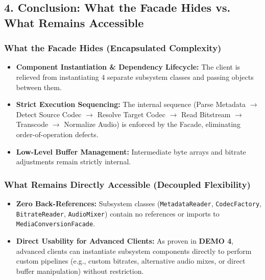 \documentclass[10pt,a4paper]{article}
\begin{document}
\clearpage

\subsection*{4. Conclusion: What the Facade Hides vs. What Remains Accessible}

\subsubsection*{What the Facade Hides (Encapsulated Complexity)}
\begin{itemize}[noitemsep,topsep=1pt,leftmargin=1.5em]
    \item \textbf{Component Instantiation \& Dependency Lifecycle:} The client is relieved from instantiating 4 separate subsystem classes and passing objects between them.
    \item \textbf{Strict Execution Sequencing:} The internal sequence (Parse Metadata $\to$ Detect Source Codec $\to$ Resolve Target Codec $\to$ Read Bitstream $\to$ Transcode $\to$ Normalize Audio) is enforced by the Facade, eliminating order-of-operation defects.
    \item \textbf{Low-Level Buffer Management:} Intermediate byte arrays and bitrate adjustments remain strictly internal.
\end{itemize}

\subsubsection*{What Remains Directly Accessible (Decoupled Flexibility)}
\begin{itemize}[noitemsep,topsep=1pt,leftmargin=1.5em]
    \item \textbf{Zero Back-References:} Subsystem classes (\texttt{MetadataReader}, \texttt{CodecFactory}, \texttt{BitrateReader}, \texttt{AudioMixer}) contain no references or imports to \texttt{MediaConversionFacade}.
    \item \textbf{Direct Usability for Advanced Clients:} As proven in \textbf{DEMO 4}, advanced clients can instantiate subsystem components directly to perform custom pipelines (e.g., custom bitrates, alternative audio mixes, or direct buffer manipulation) without restriction.
\end{itemize}
\end{document}

